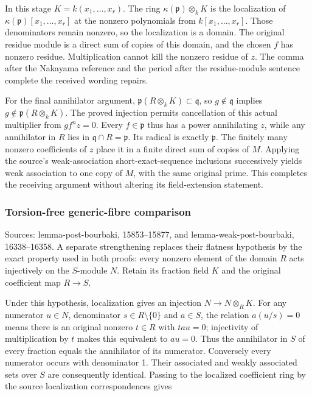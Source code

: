 In this stage \(K=k(x_1,\ldots,x_r)\). The ring \(\kappa(\mathfrak p)\otimes_kK\) is the localization of \(\kappa(\mathfrak p)[x_1,\ldots,x_r]\) at the nonzero polynomials from \(k[x_1,\ldots,x_r]\). Those denominators remain nonzero, so the localization is a domain. The original residue module is a direct sum of copies of this domain, and the chosen \(f\) has nonzero residue. Multiplication cannot kill the nonzero residue of \(z\). The comma after the Nakayama reference and the period after the residue-module sentence complete the received wording repairs.

For the final annihilator argument, \(\mathfrak p(R\otimes_kK)\subset\mathfrak q\), so \(g\notin\mathfrak q\) implies \(g\notin\mathfrak p(R\otimes_kK)\). The proved injection permits cancellation of this actual multiplier from \(gf^nz=0\). Every \(f\in\mathfrak p\) thus has a power annihilating \(z\), while any annihilator in \(R\) lies in \(\mathfrak q\cap R=\mathfrak p\). Its radical is exactly \(\mathfrak p\). The finitely many nonzero coefficients of \(z\) place it in a finite direct sum of copies of \(M\). Applying the source's weak-association short-exact-sequence inclusions successively yields weak association to one copy of \(M\), with the same original prime. This completes the receiving argument without altering its field-extension statement.

\subsubsection{Torsion-free generic-fibre comparison}\label{algebra-proof-005-torsion-free-generic-fibre-comparison}

Sources: lemma-post-bourbaki, 15853--15877, and lemma-weak-post-bourbaki, 16338--16358. A separate strengthening replaces their flatness hypothesis by the exact property used in both proofs: every nonzero element of the domain \(R\) acts injectively on the \(S\)-module \(N\). Retain its fraction field \(K\) and the original coefficient map \(R\to S\).

Under this hypothesis, localization gives an injection \(N\to N\otimes_RK\). For any numerator \(u\in N\), denominator \(s\in R\setminus\{0\}\) and \(a\in S\), the relation \(a(u/s)=0\) means there is an original nonzero \(t\in R\) with \(tau=0\); injectivity of multiplication by \(t\) makes this equivalent to \(au=0\). Thus the annihilator in \(S\) of every fraction equals the annihilator of its numerator. Conversely every numerator occurs with denominator 1. Their associated and weakly associated sets over \(S\) are consequently identical. Passing to the localized coefficient ring by the source localization correspondences gives

